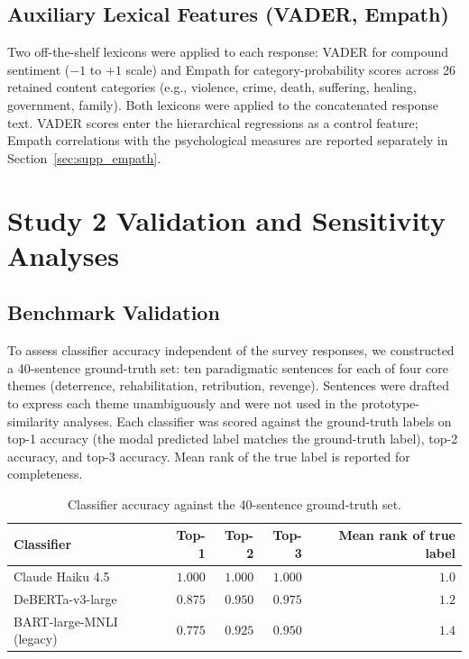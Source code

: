 \subsection{Auxiliary Lexical Features (VADER, Empath)}

Two off-the-shelf lexicons were applied to each response: VADER \citep{hutto2014vader} for compound sentiment ($-1$ to $+1$ scale) and Empath \citep{fast2016empath} for category-probability scores across 26 retained content categories (e.g., violence, crime, death, suffering, healing, government, family). Both lexicons were applied to the concatenated response text. VADER scores enter the hierarchical regressions as a control feature; Empath correlations with the psychological measures are reported separately in Section~\ref{sec:supp_empath}.

\section{Study 2 Validation and Sensitivity Analyses}
\label{sec:supp_nlp_validation}

\subsection{Benchmark Validation}

To assess classifier accuracy independent of the survey responses, we constructed a 40-sentence ground-truth set: ten paradigmatic sentences for each of four core themes (deterrence, rehabilitation, retribution, revenge). Sentences were drafted to express each theme unambiguously and were not used in the prototype-similarity analyses. Each classifier was scored against the ground-truth labels on top-1 accuracy (the modal predicted label matches the ground-truth label), top-2 accuracy, and top-3 accuracy. Mean rank of the true label is reported for completeness.

\begin{table}[htbp]
  \centering
  \caption{Classifier accuracy against the 40-sentence ground-truth set.}
  \label{tab:supp_benchmark}
  \small
  \begin{tabular}{lrrrr}
    \toprule
    Classifier & Top-1 & Top-2 & Top-3 & Mean rank of true label \\
    \midrule
    Claude Haiku 4.5         & $1.000$ & $1.000$ & $1.000$ & $1.0$ \\
    DeBERTa-v3-large         & $0.875$ & $0.950$ & $0.975$ & $1.2$ \\
    BART-large-MNLI (legacy) & $0.775$ & $0.925$ & $0.950$ & $1.4$ \\
    \bottomrule
  \end{tabular}
\end{table}

